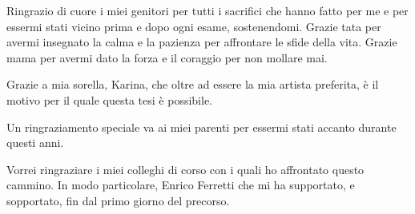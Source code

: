 \documentclass[a4paper,singleside,11pt]{report}
\begin{document}
Ringrazio di cuore i miei genitori per tutti i sacrifici che hanno fatto per me e per essermi stati vicino prima e dopo ogni esame, sostenendomi. Grazie  tata per avermi insegnato la calma e la pazienza per affrontare le sfide della vita. Grazie mama per avermi dato la forza e il coraggio per non mollare mai.

Grazie a mia sorella, Karina, che oltre ad essere la mia artista preferita, \`e il motivo per il quale questa tesi \`e possibile.

Un ringraziamento speciale va ai miei parenti per essermi stati accanto durante questi anni.


Vorrei ringraziare i miei colleghi di corso con i quali ho affrontato questo cammino. In modo particolare, Enrico Ferretti che mi ha supportato, e sopportato, fin dal primo giorno del precorso.
\end{document}
